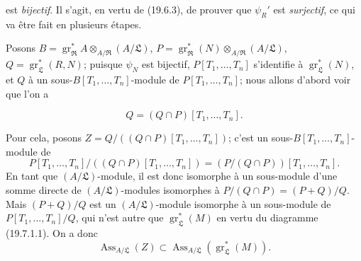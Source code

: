
est \emph{bijectif}. Il s'agit, en vertu de (19.6.3), de prouver que $\psi_R'$ est \emph{surjectif}, ce qui va être fait en plusieurs étapes.

\begin{env}[19.7.1.2]
\label{IV.19.7.1.2}
Posons $B=\operatorname{gr}_{\mathfrak R}^*A\otimes_{A/\mathfrak R}(A/\mathfrak L)$, $P=\operatorname{gr}_{\mathfrak R}^*(N)\otimes_{A/\mathfrak R}(A/\mathfrak L)$, $Q=\operatorname{gr}_{\mathfrak L}^*(R,N)$; puisque $\psi_N$ est bijectif, $P[T_1,\ldots,T_n]$ s'identifie à $\operatorname{gr}_{\mathfrak L}^*(N)$, et $Q$ à un sous-$B[T_1,\ldots,T_n]$-module de $P[T_1,\ldots,T_n]$; nous allons d'abord voir que l'on a
\end{env}

\begin{env}[19.7.1.3]
\label{IV.19.7.1.3}
\[
  Q=(Q\cap P)[T_1,\ldots,T_n].
\]
\end{env}

Pour cela, posons $Z=Q/((Q\cap P)[T_1,\ldots,T_n])$; c'est un sous-$B[T_1,\ldots,T_n]$-module de
\[
  P[T_1,\ldots,T_n]/((Q\cap P)[T_1,\ldots,T_n])=(P/(Q\cap P))[T_1,\ldots,T_n].
\]
En tant que $(A/\mathfrak L)$-module, il est donc isomorphe à un sous-module d'une somme directe de $(A/\mathfrak L)$-modules isomorphes à $P/(Q\cap P)=(P+Q)/Q$. Mais $(P+Q)/Q$ est un $(A/\mathfrak L)$-module isomorphe à un sous-module de $P[T_1,\ldots,T_n]/Q$, qui n'est autre que $\operatorname{gr}_{\mathfrak L}^*(M)$ en vertu du diagramme (19.7.1.1). On a donc
\begin{equation}
  \operatorname{Ass}_{A/\mathfrak L}(Z)\subset\operatorname{Ass}_{A/\mathfrak L}(\operatorname{gr}_{\mathfrak L}^*(M)).
  \tag{19.7.1.4}\label{IV.19.7.1.4}
\end{equation}

